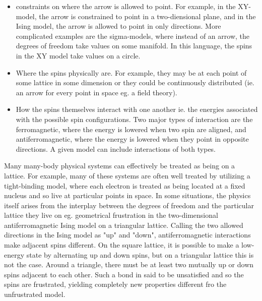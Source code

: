 \documentclass{homework}
\begin{document}
\begin{itemize}
    \item constraints on where the arrow is allowed to point. For example, in the XY-model, the arrow is constrained to point in a two-diensional plane, and in the Ising model, the arrow is allowed to point in only directions. More complicated examples are the sigma-models, where instead of an arrow, the degrees of freedom take values on some manifold. In this language, the spins in the XY model take values on a circle. \\
    \item Where the spins physically are. For example, they may be at each point of some lattice in some dimension or they could be continuously distributed (ie. an arrow for every point in space eg. a field theory). \\
    \item How the spins themselves interact with one another ie. the energies associated with the possible spin configurations. Two major types of interaction are the ferromagnetic, where the energy is lowered when two spin are aligned, and antiferromagnetic, where the energy is lowered when they point in opposite directions. A given model can include interactions of both types. \\
\end{itemize}

Many many-body physical systems can effectively be treated as being on a lattice. For example, many of these systems are often well treated by utilizing a tight-binding model, where each electron is treated as being located at a fixed nucleus and so live at particular points in space. In some situations, the physics itself arises from the interplay between the degrees of freedom and the particular lattice they live on eg. geometrical frustration in the two-dimensional antiferromagnetic Ising model on a triangular lattice. Calling the two allowed directions in the Ising model as "up" and "down", antiferromagnetic interactions make adjacent spins different. On the square lattice, it is possible to make a low-energy state by alternating up and down spins, but on a triangular lattice this is not the case. Around a triangle, there must be at least two mutually up or down spins adjacent to each other. Such a bond in said to be unsatisfied and so the spins are frustrated, yielding completely new properties different fro the unfrustrated model. \\

\end{document}
